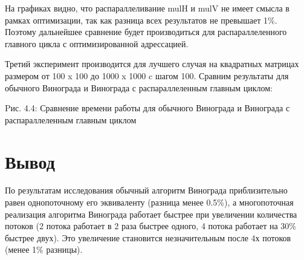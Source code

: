 \documentclass[12pt]{report}
\begin{document}
На графиках видно, что распараллеливание mulH и mulV не имеет смысла в рамках оптимизации, так как разница всех результатов не превышает 1\%.
Поэтому дальнейшее сравнение будет производиться для распараллеленного главного цикла с оптимизированной адрессацией.  

Третий эксперимент производится для лучшего случая на квадратных матрицах размером от 100 x 100 до 1000 x 1000 c шагом 100. 
Сравним результаты для обычного Винограда и Винограда с распараллеленным главным циклом:

\begin{center}
Pис. 4.4: Сравнение времени работы для обычного Винограда и Винограда с распараллеленным главным циклом
\end{center}


\section{Вывод}
По результатам исследования обычный алгоритм Винограда приблизительно равен однопоточному его эквиваленту (разница менее 0.5\%), а многопоточная реализация алгоритма Винограда работает быстрее при увеличении количества потоков (2 потока работает в 2 раза быстрее одного, 4 потока работает на 30\% быстрее двух). Это увеличение становится незначительным после 4х потоков (менее 1\% разницы).
\end{document}
